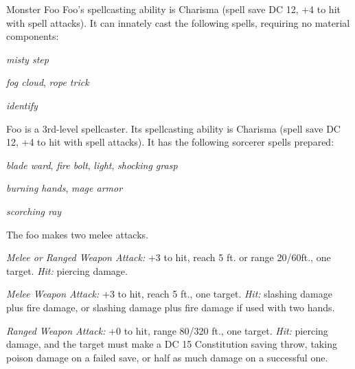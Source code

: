 \documentclass[10pt,twoside,twocolumn,openany,bg=full,notitlepage,nodeprecatedcode]{dndarticle}
\begin{document}
\begin{DndMonster}{Monster Foo}
\DndMonsterBasics[%
armorclass = 9 (12 with \emph{mage armor}),
hitpoints = 3d8+3,
speed = {30 ft., fly 30 ft.},
]
\DndMonsterAbilityScores[%
CON = 13,
STR = 12,
DEX = 8,
INT = 10,
WIS = 14,
CHA = 15,
]
\DndMonsterDetails[%
senses = {darkvision 60ft., passive Perception 10},
languages = {Common, Goblin},
challenge = {1},
]
Foo's spellcasting ability is Charisma (spell save DC 12, +4 to hit with spell attacks). It can innately cast the following spells, requiring no material components:\par
{}
\emph{misty step}\par
{}
\emph{fog cloud}, \emph{rope trick}\par
{}
\emph{identify}\par
{}
Foo is a 3rd-level spellcaster. Its spellcasting ability is Charisma (spell save DC 12, +4 to hit with spell attacks). It has the following sorcerer spells prepared:\par
{}
\emph{blade ward}, \emph{fire bolt}, \emph{light}, \emph{shocking grasp}\par
{}
\emph{burning hands}, \emph{mage armor}\par
{}
\emph{scorching ray}\par
{}
The foo makes two melee attacks.\par
{}
\emph{Melee or Ranged Weapon Attack:} +3 to hit, reach 5 ft. or range 20/60ft., one target. \emph{Hit:}  piercing damage.\par
{}
\emph{Melee Weapon Attack:} +3 to hit, reach 5 ft., one target. \emph{Hit:}  slashing damage plus  fire damage, or  slashing damage plus  fire damage if used with two
hands.\par
{}
\emph{Ranged Weapon Attack:} +0 to hit, range 80/320 ft., one target. \emph{Hit:}  piercing damage, and the target must make a DC 15 Constitution saving throw, taking  poison damage on a failed save, or half as much damage on a successful one.\par
\end{DndMonster}
\end{document}
